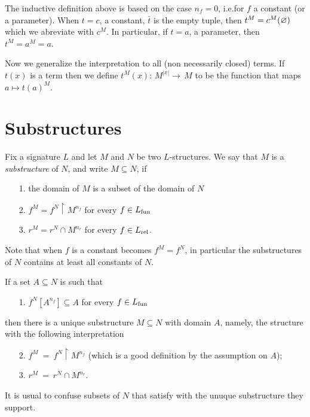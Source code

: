 The inductive definition above is based on the case $n_f=0$, i.e.\@ for $f$ a constant (or a parameter).  When $t=c$, a constant, $\bar t$ is the empty tuple, then $t^M=c^M(\varnothing)$ which we abreviate with $c^M$. In particular, if $t=a$, a parameter, then $t^M=a^M=a$.

Now we generalize the interpretation to all (non necessarily closed) terms. If $t(x)$ is a term then we define \emph{$t^M\!(x) :\,M^{|x|}\to\, M$} to be the function that maps $a\mapsto t(a)^M$.

\section{Substructures}
\label{sottostrutture}


\def\medrel#1{\parbox[t]{6ex}{$\displaystyle\hfil #1$}}
\def\ceq#1#2#3{\parbox{10ex}{$\displaystyle #1$}\medrel{#2}$\displaystyle  #3$}


\begin{definition}\label{sottostrutturadef}
Fix a signature $L$ and let $M$ and $N$ be two $L$-structures. We say that $M$ is a \emph{substructure\/} of $N$, and write \emph{$M\subseteq N$}, if
\begin{itemize}
\item[1.] the domain of $M$ is a subset of the domain of $N$
\item[2.] $f^M=f^N\restriction M^{n_f}$ for every $f\in L_{\rm fun}$
\item[3.] $r^M=r^N\cap M^{n_r}$ for every $f\in L_{\rm rel}$.
\end{itemize}
\end{definition}

Note that when $f$ is a constant  becomes $f^M=f^N$, in particular the substructures of $N$ contains at least all constants of $N$.

If a set $A\subseteq N$ is such that 
\begin{itemize}
\item[1.] $f^N[A^{n_f}]\subseteq A$ for every  $f\in L_{\rm fun}$ 
\end{itemize}
then there is a unique substructure $M\subseteq N$ with domain $A$, namely, the structure with the following interpretation
\begin{itemize}
\item[2.] $f^M\ =\ f^N\restriction M^{n_f}$ (which is a good definition by the assumption on $A$);
\item[3.] $r^M\ =\ r^N\cap M^{n_r}$.
\end{itemize}
It is usual to confuse subsets of $N$ that satisfy  with the unuque substructure they support.

